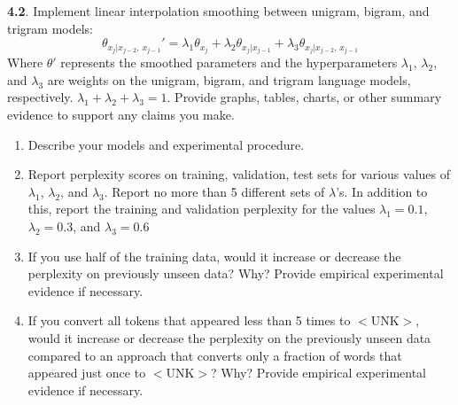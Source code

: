 \textbf{4.2}. Implement linear interpolation smoothing between unigram, bigram, and trigram models: 
    $$\theta_{x_j \vert x_{j-2}, \, x_{j-1}}' = \lambda_1 \theta_{x_j} + \lambda_2 \theta_{x_j \vert x_{j-1}} + \lambda_3 \theta_{x_j \vert x_{j-2}, \, x_{j-1}}$$ 
Where $\theta'$ represents the smoothed parameters and the hyperparameters $\lambda_1$, $\lambda_2$, and $\lambda_3$ are weights on the unigram, bigram, and trigram language models, respectively. $\lambda_1 + \lambda_2 + \lambda_3 = 1$. Provide graphs, tables, charts, or other summary evidence to support any claims you make.

\begin{enumerate}
    \item Describe your models and experimental procedure.
	
    \item Report perplexity scores on training, validation, test sets for various values of $\lambda_1$, $\lambda_2$, and $\lambda_3$. Report no more than 5 different sets of $\lambda$’s. In addition to this, report the training and validation perplexity for the values $\lambda_1 = 0.1$, $\lambda_2 = 0.3$, and $\lambda_3 = 0.6$
	
    \item If you use half of the training data, would it increase or decrease the perplexity on previously unseen data? Why? Provide empirical experimental evidence if necessary.
	
    \item If you convert all tokens that appeared less than 5 times to $<$UNK$>$, would it increase or decrease the perplexity on the previously unseen data compared to an approach that converts only a fraction of words that appeared just once to $<$UNK$>$? Why? Provide empirical experimental evidence if necessary.
	
\end{enumerate}
